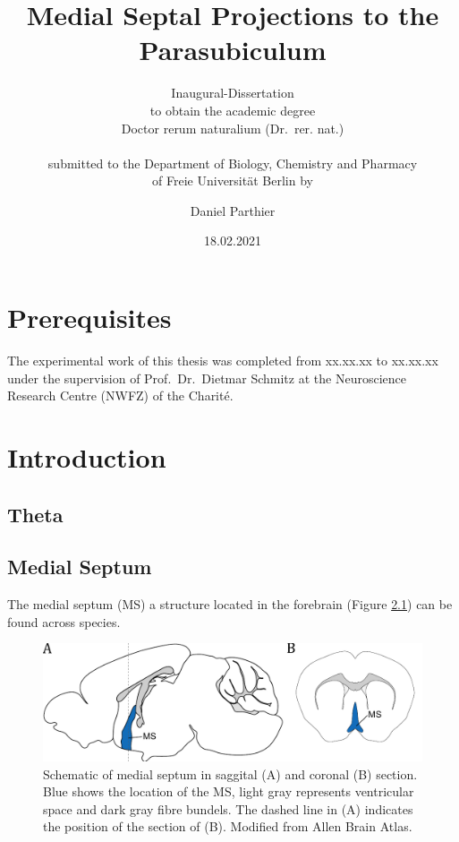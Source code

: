 \documentclass[
  12pt,
]{book}
\title{Medial Septal Projections to the Parasubiculum}
\subtitle{Inaugural-Dissertation\\
to obtain the academic degree\\
Doctor rerum naturalium (Dr.~rer. nat.)\\
~\\
submitted to the Department of Biology, Chemistry and Pharmacy\\
of Freie Universität Berlin by}
\author{Daniel Parthier}
\date{18.02.2021}
\begin{document}
\maketitle

{
\setcounter{tocdepth}{1}
\tableofcontents
}
\hypertarget{prerequisites}{%
\chapter{Prerequisites}\label{prerequisites}}

The experimental work of this thesis was completed from xx.xx.xx to xx.xx.xx under the supervision of Prof.~Dr.~Dietmar Schmitz at the Neuroscience Research Centre (NWFZ) of the Charité.

\hypertarget{intro}{%
\chapter{Introduction}\label{intro}}

\hypertarget{theta}{%
\section{Theta}\label{theta}}

\hypertarget{medial-septum}{%
\section{Medial Septum}\label{medial-septum}}

The medial septum (MS) a structure located in the forebrain (Figure \ref{fig:MS-Scheme}) can be found across species.

\begin{figure}[H]

{\centering \includegraphics{Figures/Schemes/MS_schematic} 

}

\caption{Schematic of medial septum in saggital (A) and coronal (B) section. Blue shows the location of the MS, light gray represents ventricular space and dark gray fibre bundels. The dashed line in (A) indicates the position of the section of (B). Modified from Allen Brain Atlas.}\label{fig:MS-Scheme}
\end{figure}
\end{document}
